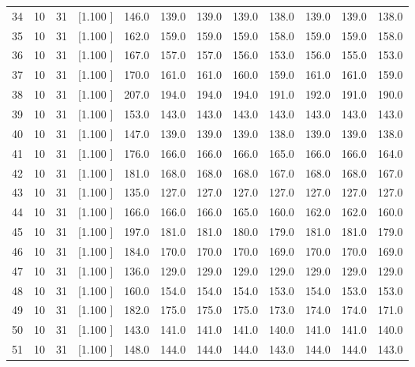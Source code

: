 \documentclass[12pt,a4paper]{article}
\begin{document}
\begin{center}
{\begin{tabular}{r r r r r r r r r r r r}
  34& 10& 31&[1.100     ]&   146.0&   139.0&   139.0&   139.0&   138.0&   139.0&   139.0&   138.0\\[-0.02in]
  35& 10& 31&[1.100     ]&   162.0&   159.0&   159.0&   159.0&   158.0&   159.0&   159.0&   158.0\\[-0.02in]
  36& 10& 31&[1.100     ]&   167.0&   157.0&   157.0&   156.0&   153.0&   156.0&   155.0&   153.0\\[-0.02in]
  37& 10& 31&[1.100     ]&   170.0&   161.0&   161.0&   160.0&   159.0&   161.0&   161.0&   159.0\\[-0.02in]
  38& 10& 31&[1.100     ]&   207.0&   194.0&   194.0&   194.0&   191.0&   192.0&   191.0&   190.0\\[-0.02in]
  39& 10& 31&[1.100     ]&   153.0&   143.0&   143.0&   143.0&   143.0&   143.0&   143.0&   143.0\\[-0.02in]
  40& 10& 31&[1.100     ]&   147.0&   139.0&   139.0&   139.0&   138.0&   139.0&   139.0&   138.0\\[-0.02in]
  41& 10& 31&[1.100     ]&   176.0&   166.0&   166.0&   166.0&   165.0&   166.0&   166.0&   164.0\\[-0.02in]
  42& 10& 31&[1.100     ]&   181.0&   168.0&   168.0&   168.0&   167.0&   168.0&   168.0&   167.0\\[-0.02in]
  43& 10& 31&[1.100     ]&   135.0&   127.0&   127.0&   127.0&   127.0&   127.0&   127.0&   127.0\\[-0.02in]
  44& 10& 31&[1.100     ]&   166.0&   166.0&   166.0&   165.0&   160.0&   162.0&   162.0&   160.0\\[-0.02in]
  45& 10& 31&[1.100     ]&   197.0&   181.0&   181.0&   180.0&   179.0&   181.0&   181.0&   179.0\\[-0.02in]
  46& 10& 31&[1.100     ]&   184.0&   170.0&   170.0&   170.0&   169.0&   170.0&   170.0&   169.0\\[-0.02in]
  47& 10& 31&[1.100     ]&   136.0&   129.0&   129.0&   129.0&   129.0&   129.0&   129.0&   129.0\\[-0.02in]
  48& 10& 31&[1.100     ]&   160.0&   154.0&   154.0&   154.0&   153.0&   154.0&   153.0&   153.0\\[-0.02in]
  49& 10& 31&[1.100     ]&   182.0&   175.0&   175.0&   175.0&   173.0&   174.0&   174.0&   171.0\\[-0.02in]
  50& 10& 31&[1.100     ]&   143.0&   141.0&   141.0&   141.0&   140.0&   141.0&   141.0&   140.0\\[-0.02in]
  51& 10& 31&[1.100     ]&   148.0&   144.0&   144.0&   144.0&   143.0&   144.0&   144.0&   143.0\\[-0.02in]

\end{tabular}}
\end{center}
\end{document}
